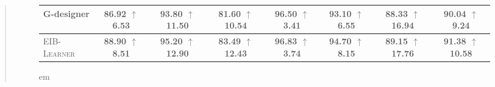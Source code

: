 \documentclass[11pt]{article}
\newcommand{\ourmethod}{\textsc{{EIB-Learner}}\xspace}
\begin{document}
\begin{abstract}
\begin{figure}[ht!]
\begin{table}[t]
{\begin{tabular}{l|cccccc|c}
G-designer             & 86.92 \scriptsize$\uparrow$6.53       & 93.80 \scriptsize$\uparrow$11.50         & 81.60 \scriptsize$\uparrow$10.54         & 96.50 \scriptsize$\uparrow$3.41            & 93.10 \scriptsize$\uparrow$6.55          & 88.33 \scriptsize$\uparrow$16.94             & 90.04 \scriptsize$\uparrow$9.24        \\  \midrule
\ourmethod             & \textbf{88.90 \scriptsize$\uparrow$8.51}       & \textbf{95.20 \scriptsize$\uparrow$12.90}          & \textbf{83.49 \scriptsize$\uparrow$12.43}         & \textbf{96.83 \scriptsize$\uparrow$3.74}               & \textbf{94.70 \scriptsize$\uparrow$8.15}         & \textbf{89.15 \scriptsize$\uparrow$17.76}              & \textbf{91.38 \scriptsize$\uparrow$10.58}          \\  
\bottomrule
\end{tabular}
}
 em
\end{table}


\end{figure}
\end{abstract}
\end{document}
